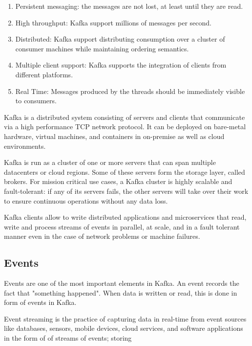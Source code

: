 \begin{enumerate}
    \item   Persistent messaging: the messages are not lost, at least until
            they are read.
    \item   High throughput: Kafka support millions of messages per second.
    \item   Distributed: Kafka support distributing consumption over a cluster
            of consumer machines while maintaining ordering semantics.
    \item   Multiple client support: Kafka supports the integration of clients
            from different platforms.
    \item   Real Time: Messages produced by the threads should be immediately
            visible to consumers.
\end{enumerate}

Kafka is a distributed system consisting of servers and clients that
communicate via a high performance TCP network protocol.  It can be deployed
on bare-metal hardware, virtual machines, and containers in on-premise as well
as cloud environments.

Kafka is run as a cluster of one or more servers that can span multiple
datacenters or cloud regions. Some of these servers form the storage layer,
called brokers. For mission critical use cases, a Kafka cluster is highly
scalable and fault-tolerant: if any of its servers fails, the other servers
will take over their work to ensure continuous operations without any data
loss.

Kafka clients allow to write distributed applications and microservices that
read, write and process streams of events in parallel, at scale, and in a fault
tolerant manner even in the case of network problems or machine failures.

\subsection{Events}

Events are one of the most important elements in Kafka.
An event records the fact that "something happened". When data is written or
read, this is done in form of events in Kafka. \cite{kafka_documentation}

Event streaming is the practice of capturing data in real-time from event
sources like databases, sensors, mobile devices, cloud services, and software
applications in the form of of streams of events; storing 

